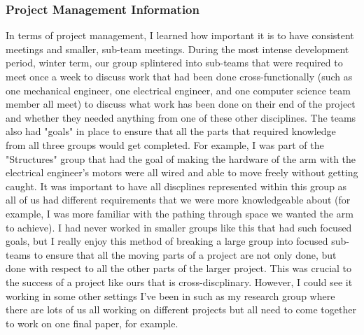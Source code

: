\subsubsection{Project Management Information}
In terms of project management, I learned how important it is to have consistent meetings and smaller, sub-team meetings.
During the most intense development period, winter term, our group splintered into sub-teams that were required to
meet once a week to discuss work that had been done cross-functionally (such as one mechanical engineer, one
electrical engineer, and one computer science team member all meet) to discuss what work has been done
on their end of the project and whether they needed anything from one of these other disciplines. The teams
also had "goals" in place to ensure that all the parts that required knowledge from all three groups
would get completed. For example, I was part of the "Structures" group that had the goal of making
the hardware of the arm with the electrical engineer's motors were all wired and able to move freely without
getting caught. It was important to have all discplines represented within this group as all of us had
different requirements that we were more knowledgeable about (for example, I was more familiar with
the pathing through space we wanted the arm to achieve). I had never worked in smaller groups
like this that had such focused goals, but I really enjoy this method of breaking a large group
into focused sub-teams to ensure that all the moving parts of a project are not only done, but done
with respect to all the other parts of the larger project. This was crucial to the success of a project like ours that is
cross-discplinary. However, I could see it working in some other settings I've been in such as my research group
where there are lots of us all working on different projects but all need to come together to work on one final paper, for example.

